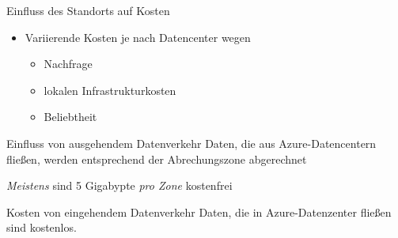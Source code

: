 \begin{flashcard}[\ ]{Einfluss des Standorts auf Kosten}
    \begin{itemize}
        \item Variierende Kosten je nach Datencenter wegen
        \begin{itemize}
            \item Nachfrage
            \item lokalen Infrastrukturkosten
            \item Beliebtheit
        \end{itemize}
    \end{itemize}

\end{flashcard}

\begin{flashcard}[\ ]{Einfluss von ausgehendem Datenverkehr}
    Daten, die aus Azure-Datencentern fließen, werden entsprechend der Abrechungszone abgerechnet

    \vspace{5mm}
    \emph{Meistens} sind 5 Gigabypte \emph{pro Zone} kostenfrei
\end{flashcard}

\begin{flashcard}[\ ]{Kosten von eingehendem Datenverkehr}
    Daten, die in Azure-Datenzenter fließen sind kostenlos.
\end{flashcard}

